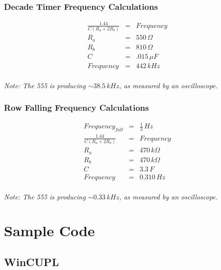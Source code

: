 \documentclass[letterpaper,titlepage,oneside]{article}
\begin{document}
\subsubsection*{Decade Timer Frequency Calculations}
\begin{align*}
\frac{1.44}{C(R_{a} + 2 R_{b})} &=& Frequency \\
R_{a} &=& 550\,\Omega\\ 
R_{b} &=& 810\,\Omega\\
C &=& .015\,\mu F\\
Frequency &=& 442\,kHz\\
\end{align*}
\begin{center}
\begin{small}
\textit{Note: The 555 is producing  $\sim 38.5\,kHz$, as measured by an oscilloscope.}
\end{small}
\end{center}

\subsubsection*{Row Falling Frequency Calculations}
\begin{align*}
Frequency_{fall} &=& \frac{1}{3} \, Hz\\
\frac{1.44}{C(R_{a} + 2 R_{b})} &=& Frequency \\
R_{a} &=& 470\,k\Omega\\ 
R_{b} &=& 470\,k \Omega\\
C &=& 3.3\, F\\
Frequency &=& 0.310\,Hz\\
\end{align*}
\begin{center}
\begin{small}
\textit{Note: The 555 is producing $ \sim 0.33\,kHz$, as measured by an oscilloscope.}
\end{small}
\end{center}

\clearpage
\section{Sample Code}
\subsection{WinCUPL}
\end{document}
